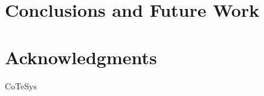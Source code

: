 \documentclass[conference]{sty/IEEEtran}
\begin{document}
\section{Conclusions and Future Work} 

\section*{Acknowledgments}
CoTeSys



\end{document}
